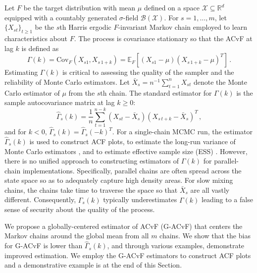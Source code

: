 \documentclass[12pt]{article}
\newcommand{\Cov}{\text{Cov}}
\newcommand{\X}{\mathcal{X}}
\theoremstyle{remark}
\begin{document}
Let $F$ be the target distribution with mean $\mu$ defined on a space $\X \subseteq \mathbb{R}^d$ equipped with a countably generated $\sigma$-field $\mathcal{B}(\X)$. For $s = 1, \dots, m$, let $\{X_{st}\}_{t\geq1}$ be the $s${th} Harris ergodic $F$-invariant Markov chain \citep[see][for definitions]{meyn:twee:2009} employed to learn characteristics about $F$. The process is covariance stationary so that
the ACvF at lag $k$ is defined as 
%
\[
    \Gamma(k) = \Cov_F(X_{s1}, X_{s\,1+k})= \mathbb{E}_F \left[(X_{s1} - \mu)(X_{s\,1+k} - \mu)^T \right]\,.
\]
Estimating $\Gamma(k)$ is critical to assessing the quality of the sampler and the reliability of Monte Carlo estimators. Let $\bar{X}_s = n^{-1} \sum_{t=1}^{n} X_{st}$ denote the Monte Carlo estimator of $\mu$ from the $s$th chain. The standard estimator for $\Gamma(k)$ is the sample autocovariance matrix at lag $k \geq 0$:
%
\begin{equation} \label{eq:empirical_ACvF}
    \hat{\Gamma}_s(k) = \dfrac{1}{n}\sum_{t=1}^{n-k} \left(X_{st} - \bar{X}_s \right) \left(X_{s\, t + k} - \bar{X}_s \right)^T\,,
\end{equation}
and for $k < 0$, $\hat{\Gamma}_s(k) = \hat{\Gamma}_s(-k)^T$. For a single-chain MCMC run, the estimator $\hat{\Gamma}_s(k)$ is used to construct ACF plots, to estimate the long-run variance of Monte Carlo estimators \citep{hannan:1970,dame:1991}, and to estimate effective sample size (ESS) \citep{kass:carlin:gelman:neal:1998,gong:fleg:2016,vats:fleg:jon:2019}. However, there is no unified approach to constructing estimators of $\Gamma(k)$ for parallel-chain implementations. Specifically, parallel chains are often spread across the state space so as to adequately capture high density areas. For slow mixing chains, the chains take time to traverse the space so that $\bar{X}_s$  are all vastly different. Consequently, $\hat{\Gamma}_s(k)$ typically underestimates $\Gamma(k)$ leading to a false sense of security about the quality of the process.


 We propose a globally-centered estimator of ACvF (G-ACvF) that centers the Markov chains around the global mean from all $m$ chains. We show that the bias for G-ACvF is lower than $\hat{\Gamma}_s(k)$, and through various examples, demonstrate improved estimation. We employ the G-ACvF estimators to construct ACF plots and a demonstrative example is at the end of this Section. 


 
\end{document}
